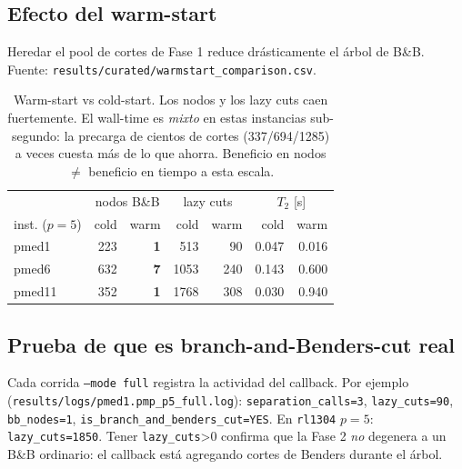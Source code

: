 \subsection{Efecto del warm-start}
Heredar el pool de cortes de Fase 1 reduce drásticamente el árbol de B\&B. Fuente:
\texttt{results/curated/warmstart\_comparison.csv}.

\begin{table}[h]\centering\small
\begin{tabular}{lrr rr rr}
\toprule
 & \multicolumn{2}{c}{nodos B\&B} & \multicolumn{2}{c}{lazy cuts} & \multicolumn{2}{c}{$T_2$ [s]} \\
inst. ($p=5$) & cold & warm & cold & warm & cold & warm \\
\midrule
pmed1  & 223 & \textbf{1} & 513  & 90  & 0.047 & 0.016 \\
pmed6  & 632 & \textbf{7} & 1053 & 240 & 0.143 & 0.600 \\
pmed11 & 352 & \textbf{1} & 1768 & 308 & 0.030 & 0.940 \\
\bottomrule
\end{tabular}
\caption{Warm-start vs cold-start. Los nodos y los lazy cuts caen fuertemente. El wall-time es
\emph{mixto} en estas instancias sub-segundo: la precarga de cientos de cortes (337/694/1285) a
veces cuesta más de lo que ahorra. Beneficio en nodos $\ne$ beneficio en tiempo a esta escala.}
\label{tab:warm}
\end{table}

\subsection{Prueba de que es branch-and-Benders-cut real}
Cada corrida \texttt{--mode full} registra la actividad del callback. Por ejemplo
(\texttt{results/logs/pmed1.pmp\_p5\_full.log}): \texttt{separation\_calls=3}, \texttt{lazy\_cuts=90},
\texttt{bb\_nodes=1}, \texttt{is\_branch\_and\_benders\_cut=YES}. En \texttt{rl1304} $p=5$:
\texttt{lazy\_cuts=1850}. Tener \texttt{lazy\_cuts}>0 confirma que la Fase 2 \emph{no} degenera a
un B\&B ordinario: el callback está agregando cortes de Benders durante el árbol.

